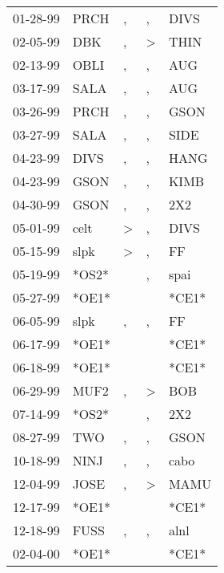 \begin{supertabular}{lllll}
 01-28-99 &   PRCH &             , &                , &   DIVS \\
 02-05-99 &    DBK &             , &     \textgreater &   THIN \\
 02-13-99 &   OBLI &             , &                , &    AUG \\
 03-17-99 &   SALA &             , &                , &    AUG \\
 03-26-99 &   PRCH &             , &                , &   GSON \\
 03-27-99 &   SALA &             , &                , &   SIDE \\
 04-23-99 &   DIVS &             , &                , &   HANG \\
 04-23-99 &   GSON &             , &                , &   KIMB \\
 04-30-99 &   GSON &             , &                , &    2X2 \\
 05-01-99 &   celt &  \textgreater &                , &   DIVS \\
 05-15-99 &   slpk &  \textgreater &                , &     FF \\
 05-19-99 &  *OS2* &               &                , &   spai \\
 05-27-99 &  *OE1* &               &                  &  *CE1* \\
 06-05-99 &   slpk &             , &                , &     FF \\
 06-17-99 &  *OE1* &               &                  &  *CE1* \\
 06-18-99 &  *OE1* &               &                  &  *CE1* \\
 06-29-99 &   MUF2 &             , &     \textgreater &    BOB \\
 07-14-99 &  *OS2* &               &                , &    2X2 \\
 08-27-99 &    TWO &             , &                , &   GSON \\
 10-18-99 &   NINJ &             , &                , &   cabo \\
 12-04-99 &   JOSE &             , &     \textgreater &   MAMU \\
 12-17-99 &  *OE1* &               &                  &  *CE1* \\
 12-18-99 &   FUSS &             , &                , &   alnl \\
 02-04-00 &  *OE1* &               &                  &  *CE1* \\

\end{supertabular}
